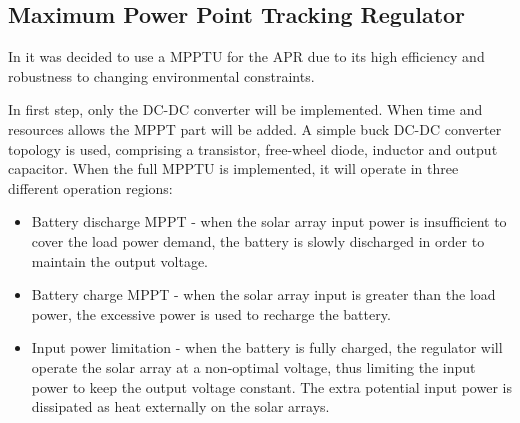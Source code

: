 \subsection{Maximum Power Point Tracking Regulator}
%
In \cite{PDR} it was decided to use a \ac{MPPTU} for the \ac{APR} due to its high efficiency and robustness to changing environmental constraints.

In first step, only the DC-DC converter will be implemented. When time and resources allows the \ac{MPPT} part will be added.
A simple buck DC-DC converter topology is used, comprising a transistor, free-wheel diode, inductor and output capacitor. 
When the full \ac{MPPTU} is implemented, it will operate in three different operation regions:
%
\begin{itemize}
\item Battery discharge {MPPT} - when the solar array input power is insufficient to cover the load power demand, the battery is slowly discharged in order to maintain the output voltage.
\item Battery charge {MPPT} - when the solar array input is greater than the load power, the excessive power is used to recharge the battery.
\item Input power limitation - when the battery is fully charged, the regulator will operate the solar array at a non-optimal voltage, thus limiting the input power to keep the output voltage constant. The extra potential input power is dissipated as heat externally on the solar arrays.
\end{itemize}
%
